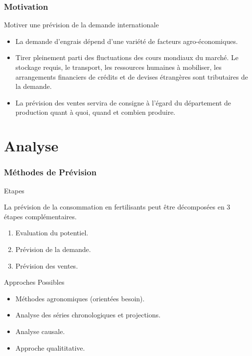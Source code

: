 \documentclass{beamer}
\begin{document}
\begin{frame}
  \frametitle{Motivation}
  \begin{block}{Motiver une prévision de la demande internationale}
    \begin{itemize}
    \item La demande d'engrais dépend d'une variété de facteurs agro-économiques.
    \item Tirer pleinement parti des fluctuations des cours mondiaux du marché. Le stockage requis, le transport, les ressources humaines à mobiliser, les arrangements financiers de crédits et de devises étrangères sont tributaires de la demande.
    \item  La prévision des ventes servira de consigne à l’égard du département de production quant à quoi, quand et combien produire.
    \end{itemize}
    \end{block}
\end{frame}


\section{Analyse}

\begin{frame}
  \frametitle{Méthodes de Prévision}
  \begin{block}{Etapes}
  \small{La prévision de la consommation en fertilisants peut être décomposées en 3 étapes complémentaires.
  \begin{enumerate}
  \item Evaluation du potentiel.
  \item Prévision de la demande.
  \item Prévision des ventes.
  \end{enumerate}
  }\end{block}

	\begin{block}{Approches Possibles}
	\small{
	\begin{itemize}
	\item Méthodes agronomiques (orientées besoin).
	\item Analyse des séries chronologiques et projections.
	\item Analyse causale.
	\item Approche qualititative.
	\end{itemize}
	}
	\end{block}
\end{frame}
\end{document}
